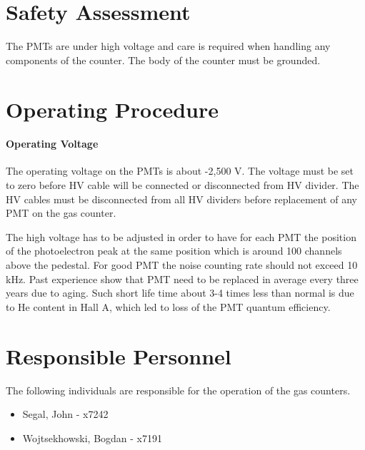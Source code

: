 \section{Safety Assessment}

\begin{safetyen}{10}{10}
The PMTs are under high voltage and care is required when handling any 
components of the counter. The body of the \Cherenkov{} counter must be grounded. 
\end{safetyen}

\section{Operating Procedure}

\paragraph{Operating Voltage}

\begin{safetyen}{10}{10}
The operating voltage on the PMTs is about -2,500 V. The voltage must be set to
zero before HV cable will be connected or disconnected from HV divider.
The HV cables must be disconnected from all HV dividers before replacement
of any PMT on the gas \Cherenkov{} counter. 
\end{safetyen}

The high voltage has to be adjusted in order to have for each PMT 
the position of the photoelectron peak at the same position 
which is around 100 channels above the pedestal. 
For good PMT the noise counting rate should not exceed 10 kHz.
Past experience show that PMT need to be replaced in average
every three years due to aging. Such short life time about 3-4 
times less than normal is due to He content in Hall A,
which led to loss of the PMT quantum efficiency.

\section{Responsible Personnel} 
The following individuals are responsible for the operation 
of the gas \Cherenkov{} counters.
 
\begin{itemize}
\item[~]Segal, John - x7242 
\item[~]Wojtsekhowski, Bogdan - x7191 
\end{itemize} 







